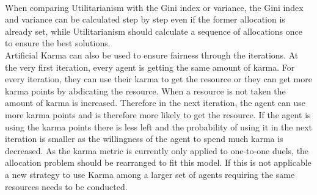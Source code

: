 \documentclass[german, a4paper, 11pt, oneside]{scrbook}
\begin{document}
\\
When comparing Utilitarianism with the Gini index or variance, the Gini index and variance can be calculated step by step even if the former allocation is already set, while Utilitarianism should calculate a sequence of allocations once to ensure the best solutions.
\\Artificial Karma can also be used to ensure fairness through the iterations. At the very first iteration, every agent is getting the same amount of karma. For every iteration, they can use their karma to get the resource or they can get more karma points by abdicating the resource. When a resource is not taken the amount of karma is increased. Therefore in the next iteration, the agent can use more karma points and is therefore more likely to get the resource. If the agent is using the karma points there is less left and the probability of using it in the next iteration is smaller as the willingness of the agent to spend much karma is decreased. As the karma metric is currently only applied to one-to-one duels, the allocation problem should be rearranged to fit this model. If this is not applicable a new strategy to use Karma among a larger set of agents requiring the same resources needs to be conducted. \cite{Elokda.2023}
\end{document}
